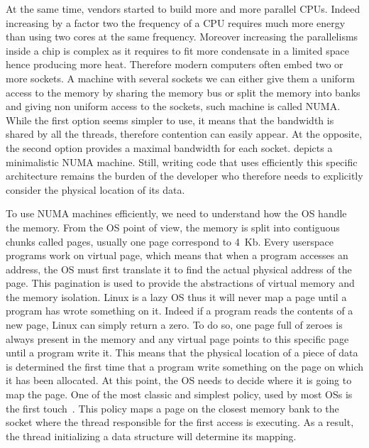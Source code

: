 At the same time, vendors started to build more and more parallel \glspl{CPU}.
Indeed increasing by a factor two the frequency of a \gls{CPU} requires much more energy than using two cores at the same frequency.
Moreover increasing the parallelisms inside a chip is complex as it requires to fit more condensate in a limited space hence producing more heat.
Therefore modern computers often embed two or more sockets.
A machine with several sockets we can either give them a uniform access to the memory by sharing the memory bus or split the memory into banks and giving non uniform access to the sockets, such machine is called \gls{NUMA}.
While the first option seems simpler to use, it means that the bandwidth is shared by all the threads, therefore contention can easily appear.
At the opposite, the second option provides a maximal bandwidth for each socket.
 depicts a minimalistic \gls{NUMA} machine.
Still, writing code that uses efficiently this specific architecture remains the burden of the developer who therefore needs to explicitly consider the physical location of its data.

To use \gls{NUMA} machines efficiently, we need to understand how the \gls{OS} handle the memory.
From the \gls{OS} point of view, the memory is split into contiguous chunks called pages, usually one page correspond to \SI{4}{Kb}.
Every userspace programs work on virtual page, which means that when a program accesses an address, the \gls{OS} must first translate it to find the actual physical address of the page.
This pagination is used to provide the abstractions of virtual memory and the memory isolation.
Linux is a lazy \gls{OS} thus it will never map a page until a program has wrote something on it.
Indeed if a program reads the contents of a new page, Linux can simply return a zero.
To do so, one page full of zeroes is always present in the memory and any virtual page points to this specific page until a program write it.
This means that the physical location of a piece of data is determined the first time that a program write something on the page on which it has been allocated.
At this point, the \gls{OS} needs to decide where it is going to map the page.
One of the most classic and simplest policy, used by most \glspl{OS} is the first touch~\cite{Marchetti95Using}.
This policy maps a page on the closest memory bank to the socket where the thread responsible for the first access is executing.
As a result, the thread initializing a data structure will determine its mapping.

